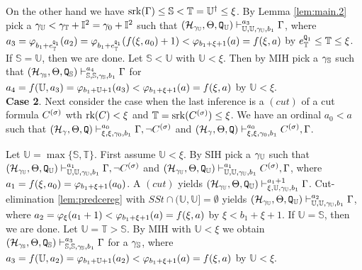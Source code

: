 \documentclass{article}
\newcommand{\mS}{\mathbb{S}}
\newcommand{\mI}{\mathbb{I}}
\newcommand{\mT}{\mathbb{T}}
\newcommand{\mU}{\mathbb{U}}
\begin{document}
On the other hand we have
${\rm srk}(\Gam)\leq\mS<\mT=\mU^{\dagger}\leq\xi$.
By Lemma \ref{lem:main.2} pick a $\gam_{\mU}<\gam_{\mT}+\mI^{2}=\gam_{0}+\mI^{2}$ such that
$
(\mathcal{H}_{\gam_{\mU}},\Tht,
{\tt Q}_{\mU}
)\vdash^{a_{3}}_{\mU,\mU,\gam_{\mU},b_{1}}
\Gam
$, where
$a_{3}=\vphi_{b_{1}+e^{{\tt Q}_{1}}_{\mT}}(a_{2})=\vphi_{b_{1}+e^{{\tt Q}_{1}}_{\mT}}(f(\xi,a_{0})+1)<
\vphi_{b_{1}+\xi+1}(a)=f(\xi,a)$ by $e^{{\tt Q}_{1}}_{\mT}\leq\mT\leq\xi$.
If $\mS=\mU$, then we are done.
Let $\mS<\mU$ with $\mU<\xi$.
Then by MIH pick a $\gam_{\mS}$ such that
$
(\mathcal{H}_{\gam_{\mS}},\Tht,
{\tt Q}_{\mS}
)\vdash^{a_{4}}_{\mS,\mS,\gam_{\mS},b_{1}}
\Gam
$ for
$a_{4}=f(\mU,a_{3})=\vphi_{b_{1}+\mU+1}(a_{3})<\vphi_{b_{1}+\xi+1}(a)=f(\xi,a)$
by $\mU<\xi$.
\\
\textbf{Case 2}. Next consider the case when the last inference is a $(cut)$ of a cut formula
$C^{(\sigma)}$ wth $\mbox{{\rm rk}}(C)<\xi$ and $\mT={\rm srk}(C^{(\sig)})\leq\xi$.
We have an ordinal $a_{0}<a$ such that 
$
(\mathcal{H}_{\gamma},\Theta,{\tt Q})
\vdash^{a_{0}}_{\xi,\xi,\gamma_{0},b_{1}}
\Gamma,\lnot C^{(\sigma)}
$
and
$
(\mathcal{H}_{\gamma},\Theta,{\tt Q})
\vdash^{a_{0}}_{\xi,\xi,\gamma_{0},b_{1}}
C^{(\sigma)},\Gamma
$.

Let $\mU=\max\{\mS,\mT\}$.
First assume $\mU<\xi$.
By SIH pick a $\gam_{\mU}$ such that
$
(\mathcal{H}_{\gamma_{\mU}},\Tht,{\tt Q}_{\mU})
\vdash^{a_{1}}_{\mU,\mU,\gam_{\mU},b_{1}}
\Gamma,\lnot C^{(\sig)}
$
and
$
(\mathcal{H}_{\gamma_{\mU}},\Tht,{\tt Q}_{\mU})
\vdash^{a_{1}}_{\mU,\mU,\gam_{\mU},b_{1}}
C^{(\sig)},\Gamma
$, where $a_{1}=f(\xi,a_{0})=\varphi_{b_{1}+\xi+1}(a_{0})$.
A $(cut)$ yields
$
(\mathcal{H}_{\gamma_{\mU}},\Tht,{\tt Q}_{\mU})
\vdash^{a_{1}+1}_{\xi,\mU,\gam_{\mU},b_{1}}
\Gamma
$.
Cut-elimination \ref{lem:predcereg} with $SSt\cap(\mU,\mU]=\emptyset$ yields
$
(\mathcal{H}_{\gamma_{\mU}},\Tht,{\tt Q}_{\mU})
\vdash^{a_{2}}_{\mU,\mU,\gam_{\mU},b_{1}}
\Gamma
$, where
$a_{2}=\varphi_{\xi}(a_{1}+1)<\varphi_{b_{1}+\xi+1}(a)=f(\xi,a)$ by $\xi<b_{1}+\xi+1$.
If $\mU=\mS$, then we are done.
Let $\mU=\mT>\mS$. By MIH with $\mU<\xi$ we obtain
$
(\mathcal{H}_{\gamma_{\mS}},\Tht,{\tt Q}_{\mS})
\vdash^{a_{3}}_{\mS,\mS,\gam_{\mS},b_{1}}
\Gamma
$
for a $\gam_{\mS}$,
where $a_{3}=f(\mU,a_{2})=\vphi_{b_{1}+\mU+1}(a_{2})<\vphi_{b_{1}+\xi+1}(a)=f(\xi,a)$
by $\mU<\xi$.
\end{document}
